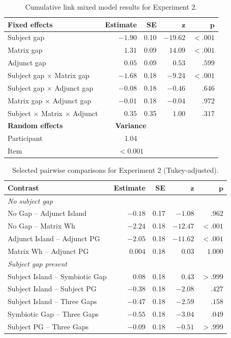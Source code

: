 \documentclass[12pt]{article}
\begin{document}
\begin{table}[!ht]
\centering
\caption{Cumulative link mixed model results for Experiment 2.}
\label{tab:exp2-clmm}
\begin{tabular}{l r r r r}
\toprule
\textbf{Fixed effects} & \textbf{Estimate} & \textbf{SE} & $\boldsymbol{z}$ & $\boldsymbol{p}$ \\
\midrule
Subject gap & $-1.90$ & 0.10 & $-19.62$ & $< .001$ \\
Matrix gap & $1.31$ & 0.09 & $14.09$ & $< .001$ \\
Adjunct gap & $0.05$ & 0.09 & $0.53$ & $.599$ \\
Subject gap $\times$ Matrix gap & $-1.68$ & 0.18 & $-9.24$ & $< .001$ \\
Subject gap $\times$ Adjunct gap & $-0.08$ & 0.18 & $-0.46$ & $.646$ \\
Matrix gap $\times$ Adjunct gap & $-0.01$ & 0.18 & $-0.04$ & $.972$ \\
Subject $\times$ Matrix $\times$ Adjunct & $0.35$ & 0.35 & $1.00$ & $.317$ \\
\midrule
\textbf{Random effects} & \multicolumn{2}{c}{\textbf{Variance}} & & \\
\midrule
Participant & \multicolumn{2}{c}{1.04} & & \\
Item & \multicolumn{2}{c}{$< 0.001$} & & \\
\bottomrule
\end{tabular}
\end{table}

\begin{table}[!ht]
\centering
\caption{Selected pairwise comparisons for Experiment 2 (Tukey-adjusted).}
\label{tab:exp2-pairwise}
\begin{tabular}{l r r r r}
\toprule
\textbf{Contrast} & \textbf{Estimate} & \textbf{SE} & $\boldsymbol{z}$ & $\boldsymbol{p}$ \\
\midrule
\multicolumn{5}{l}{\emph{No subject gap}} \\
No Gap -- Adjunct Island & $-0.18$ & 0.17 & $-1.08$ & $.962$ \\
No Gap -- Matrix Wh & $-2.24$ & 0.18 & $-12.47$ & $< .001$ \\
Adjunct Island -- Adjunct PG & $-2.05$ & 0.18 & $-11.62$ & $< .001$ \\
Matrix Wh -- Adjunct PG & $0.004$ & 0.18 & $0.03$ & $1.000$ \\
\midrule
\multicolumn{5}{l}{\emph{Subject gap present}} \\
Subject Island -- Symbiotic Gap & $0.08$ & 0.18 & $0.43$ & $> .999$ \\
Subject Island -- Subject PG & $-0.38$ & 0.18 & $-2.08$ & $.427$ \\
Subject Island -- Three Gaps & $-0.47$ & 0.18 & $-2.59$ & $.158$ \\
Symbiotic Gap -- Three Gaps & $-0.55$ & 0.18 & $-3.04$ & $.049$ \\
Subject PG -- Three Gaps & $-0.09$ & 0.18 & $-0.51$ & $> .999$ \\
\bottomrule
\end{tabular}
\end{table}
\end{document}
